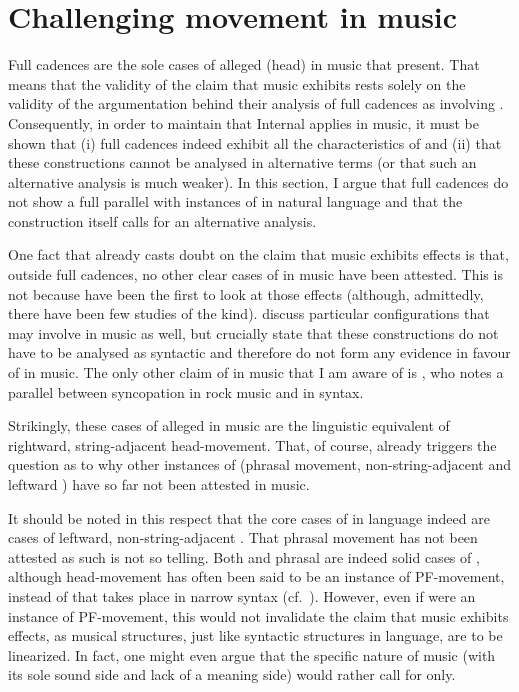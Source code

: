 \documentclass[output=paper]{langsci/langscibook}
\begin{document}
\section{Challenging movement in music}\label{sec:26.4}

Full cadences are the sole cases of alleged (head)  in music that
\citeauthor{KatzPes2011} present. That means that the validity of the claim
that music exhibits  rests solely on the validity of the argumentation
behind their analysis of full cadences as involving .
Consequently, in order to maintain that Internal  applies in music,
it must be shown that (i) full cadences indeed exhibit all the characteristics
of  and (ii) that these constructions cannot be analysed in
alternative terms (or that such an alternative analysis is much weaker). In
this section, I argue that full cadences do not show a full parallel with
instances of  in natural language and that the construction itself
calls for an alternative analysis.

One fact that already casts doubt on the claim that music exhibits 
effects is that, outside full cadences, no other clear cases of  in
music have been attested. This is not because \citeauthor{KatzPes2011} have
been the first to look at those effects (although, admittedly, there have been
few studies of the kind). \citet{RohrmeierNeuwirth2014} discuss particular
configurations that may involve  in music as well, but crucially state
that these constructions do not have to be analysed as syntactic  and
therefore do not form any evidence in favour of  in music. The only
other claim of  in music that I am aware of is \citet{Temperley1999},
who notes a parallel between syncopation in rock music and  in
syntax.

Strikingly, these cases of alleged  in music are the linguistic
equivalent of rightward, string-adjacent head-movement. That, of course,
already triggers the question as to why other instances of  (phrasal
movement, non-string-adjacent  and leftward ) have so far not
been attested in music.

It should be noted in this respect that the core cases of  in language
indeed are cases of leftward, non-string-adjacent . That phrasal
movement has not been attested as such is not so telling. Both 
and phrasal  are indeed solid cases of , although head-movement
has often been said to be an instance of PF-movement, instead of  that
takes place in narrow syntax (cf.\ \citealt{Chomsky1995,boeckxstjepanovic,Harley2004}). However, even if  were an instance of
PF-move\-ment, this would not invalidate the claim that music exhibits 
effects, as musical structures, just like syntactic structures in language, are
to be linearized. In fact, one might even argue that the specific nature of
music (with its sole sound side and lack of a meaning side) would rather call
for  only.
\end{document}
